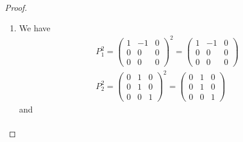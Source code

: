 \documentclass[12pt]{article}
\theoremstyle{definition}
\begin{document}
\begin{proof}
\begin{enumerate}[label=(\alph*)]
\begin{align*}
			          & = -\frac{1}{2\pi i}\begin{pmatrix}
				                               -2\pi i & -2\pi i & 0 \\
				                               0       & 0       & 0 \\
				                               0       & 0       & 0 \\
			                               \end{pmatrix}                                                                                   \\
			          & = \begin{pmatrix}
				              1 & 1 & 0 \\
				              0 & 0 & 0 \\
				              0 & 0 & 0 \\
			              \end{pmatrix}                                                                                                           \\
		      \end{align*}
		\item
		      We have \begin{align*}
			       & P_1^2 = \begin{pmatrix}1 & -1 & 0 \\ 0 & 0 & 0 \\ 0 & 0 & 0\end{pmatrix}^2 = \begin{pmatrix}1 & -1 & 0 \\ 0 & 0 & 0 \\ 0 & 0 & 0\end{pmatrix} \\
			       & P_2^2 = \begin{pmatrix}0 & 1 & 0 \\ 0 & 1 & 0 \\ 0 & 0 & 1\end{pmatrix}^2 = \begin{pmatrix}0 & 1 & 0 \\ 0 & 1 & 0 \\ 0 & 0 & 1\end{pmatrix}
		      \end{align*}
          and \begin{align*}

\end{align*}
\end{enumerate}
\end{proof}
\end{document}
